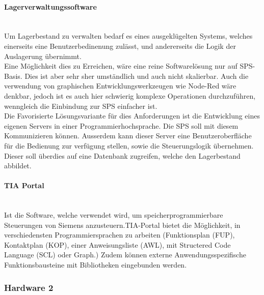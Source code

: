 \paragraph{Lagerverwaltungssoftware}\mbox{}\\
Um Lagerbestand zu verwalten bedarf es eines ausgeklügelten Systems, welches einerseits eine Benutzerbedinenung zulässt, und andererseits die Logik der Auslagerung übernimmt. \\
Eine Möglichkeit dies zu Erreichen, wäre eine reine Softwarelösung nur auf SPS-Basis. Dies ist aber sehr sher umständlich und auch nicht skalierbar. Auch die verwendung von graphischen Entwicklungswerkzeugen wie Node-Red wäre denkbar, jedoch ist es auch hier schwierig komplexe Operationen durchzuführen, wenngleich die Einbindung zur SPS einfacher ist.\\
Die Favorisierte Lösungsvariante für dies Anforderungen ist die Entwicklung eines eigenen Servers in einer Programmierhochsprache. Die SPS soll mit diesem Kommunizieren können. Ausserdem kann dieser Server eine Benutzeroberfläche für die Bedienung zur verfügung stellen, sowie die Steuerungslogik übernehmen. Dieser soll überdies auf eine Datenbank zugreifen, welche den Lagerbestand abbildet.


\paragraph{TIA Portal}\mbox{}\\
Ist die Software, welche verwendet wird, um speicherprogrammierbare Steuerungen von Siemens anzusteuern.TIA-Portal bietet die Möglichkeit, in verschiedensten Programmiersprachen zu arbeiten (Funktionsplan (FUP), Kontaktplan (KOP), einer Anweisungsliste (AWL), mit Structered Code Language (SCL) oder Graph.) Zudem können externe Anwendungsspezifische Funktionsbausteine mit Bibliotheken eingebunden werden.
\cite{TIA_Portal_Programmiersprachen}

\subsubsection{Hardware 2}

